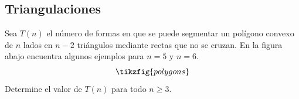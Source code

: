 \subsection{Triangulaciones}
Sea $T(n)$ el número de formas en que se puede segmentar un polígono convexo
de $n$ lados en $n-2$ triángulos mediante rectas que no se cruzan.
En la figura abajo encuentra algunos ejemplos para $n= 5$ y $n= 6$.
\[
	\tikzfig{polygons}
\]
Determine el valor de $T(n)$ para todo $n \geq 3$.
